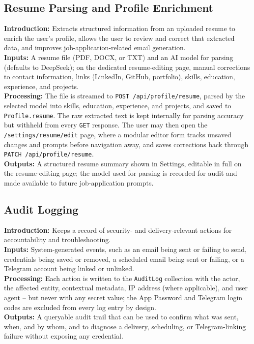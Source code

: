 \documentclass[12pt,a4paper]{article}
\begin{document}
\subsection{Resume Parsing and Profile Enrichment}
\noindent\textbf{Introduction:} Extracts structured information from an uploaded resume to enrich the user's profile, allows the user to review and correct that extracted data, and improves job-application-related email generation.\\
\noindent\textbf{Inputs:} A resume file (PDF, DOCX, or TXT) and an AI model for parsing (defaults to DeepSeek); on the dedicated resume-editing page, manual corrections to contact information, links (LinkedIn, GitHub, portfolio), skills, education, experience, and projects.\\
\noindent\textbf{Processing:} The file is streamed to \texttt{POST /api/profile/resume}, parsed by the selected model into skills, education, experience, and projects, and saved to \texttt{Profile.resume}. The raw extracted text is kept internally for parsing accuracy but withheld from every \texttt{GET} response. The user may then open the \texttt{/settings/resume/edit} page, where a modular editor form tracks unsaved changes and prompts before navigation away, and saves corrections back through \texttt{PATCH /api/profile/resume}.\\
\noindent\textbf{Outputs:} A structured resume summary shown in Settings, editable in full on the resume-editing page; the model used for parsing is recorded for audit and made available to future job-application prompts.

\subsection{Audit Logging}
\noindent\textbf{Introduction:} Keeps a record of security- and delivery-relevant actions for accountability and troubleshooting.\\
\noindent\textbf{Inputs:} System-generated events, such as an email being sent or failing to send, credentials being saved or removed, a scheduled email being sent or failing, or a Telegram account being linked or unlinked.\\
\noindent\textbf{Processing:} Each action is written to the \texttt{AuditLog} collection with the actor, the affected entity, contextual metadata, IP address (where applicable), and user agent -- but never with any secret value; the App Password and Telegram login codes are excluded from every log entry by design.\\
\noindent\textbf{Outputs:} A queryable audit trail that can be used to confirm what was sent, when, and by whom, and to diagnose a delivery, scheduling, or Telegram-linking failure without exposing any credential.
\end{document}
